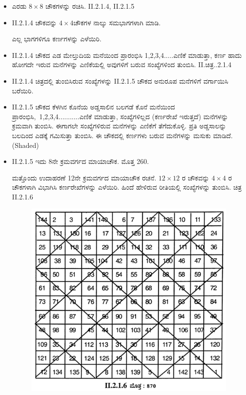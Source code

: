 \begin{itemize}
	\item ಎರಡು $8 \times 8$ ಚೌಕಗಳನ್ನು ರಚಿಸಿ. II.2.1.4, II.2.1.5
	\item II.2.1.4 ಚೌಕವನ್ನು $4 \times 4$ಚೌಕಗಳ ನಾಲ್ಕು ಸಮಭಾಗಗಳಾಗಿ ಮಾಡಿ.

	ಎಲ್ಲ ಭಾಗಗಳಿಗೂ ಕರ್ಣಗಳನ್ನು ಎಳೆಯಿರಿ.
	\item II.2.1.4 ಚೌಕದ ಎಡ ಮೇಲ್ತುದಿಯ ಮನೆಯಿಂದ ಪ್ರಾರಂಭಿಸಿ 1,2,3,4.....ಎಣಿಕೆ ಮಾಡುತ್ತಾ, ಕರ್ಣ ಹಾದು ಹೋಗದೇ ಇರುವ ಮನೆಗಳನ್ನು ಎಣಿಕೆಯಲ್ಲಿ ಅವುಗಳಿಗೆ ಬರುವ ಸಂಖ್ಯೆಗಳಿಂದ ತುಂಬಿಸಿ. II.ಚಿತ್ರ..2.1.4
	\item II.2.1.4 ಚಿತ್ರದಲ್ಲಿ ತುಂಬಿಸಿರುವ ಸಂಖ್ಯೆಗಳನ್ನು II.2.1.5 ಚೌಕದ ಅನುರೂಪ ಮನೆಗಳಿಗೆ ವರ್ಗಾಯಿಸಿ ಬರೆಯಿರಿ.
	\item II.2.1.5 ಚೌಕದ ಕೆಳಗಿನ ಕೊನೆಯ ಅಡ್ಡಸಾಲಿನ ಬಲಗಡೆ ಕೊನೆ ಮನೆಯಿಂದ \hbox{ಪ್ರಾರಂಭಿಸಿ, 1,2,3,4...........ಎಣಿಕೆ} ಮಾಡುತ್ತಾ, ಸಂಖ್ಯೆಗಳಿಲ್ಲದ (ಕರ್ಣರೇಖೆ ಇರುತ್ತದೆ) ಮನೆಗಳನ್ನು ಕ್ರಮವಾಗಿ ತುಂಬಿಸಿ. ಈಗಾಗಲೇ ಸಂಖ್ಯೆಗಳಿರುವ ಮನೆಗಳನ್ನು ಎಣಿಕೆಗೆ ತೆಗೆದುಕೊಳ್ಳಿ. ಪ್ರತಿ ಅಡ್ಡಸಾಲನ್ನು ಬಲದಿಂದ ಎಡಕ್ಕೆ ಗಮಿಸುತ್ತಾ ತುಂಬಿಸಿ. ಈ ಚೌಕದಲ್ಲಿ ಕರ್ಣಗಳು ಬರುವ ಮನೆಗಳನ್ನು ಮಸುಕು ಮಾಡಿದೆ. (Shaded)
	\item II.2.1.5 ಇದು 8ನೇ ಕ್ರಮವರ್ಗದ ಮಾಯಾಚೌಕ. ಮೊತ್ತ 260.

	ಮತ್ತೊಂದು ಉದಾಹರಣೆ 12ನೇ ಕ್ರಮವರ್ಗದ ಮಾಯಾಚೌಕ ರಚನೆ. $12\times 12$ ರ ಚೌಕವನ್ನು $4 \times 4$ ರ ಚೌಕಗಳಾಗಿ ವಿಭಾಗಿಸಿ ಕರ್ಣರೇಖೆಗಳನ್ನು ಎಳೆಯಿರಿ. ಹಿಂದೆ ಹೇಳಿರುವ ರೀತಿಯಲ್ಲಿ ಸಂಖ್ಯೆಗಳನ್ನು ತುಂಬಿಸಿ. ಚಿತ್ರ II.2.1.6
	\begin{figure}[H]
	\includegraphics{src/figures/chap3/fig3-19.jpg}
	\end{figure}
\end{itemize}

